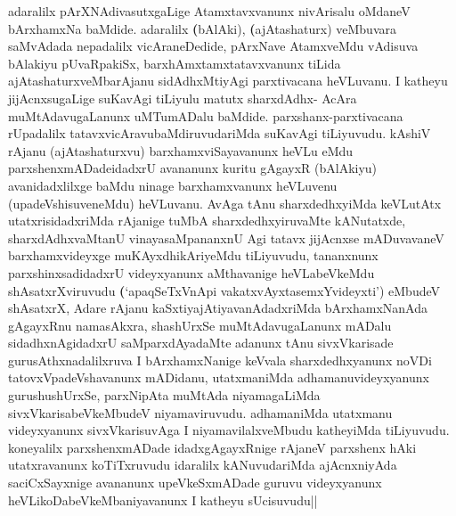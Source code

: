 \begin{artha}
adaralilx pArXNAdivasutxgaLige Atamxtavxvanunx nivArisalu oMdaneV bArxhamxNa 	 baMdide. adaralilx \textbf(bAlAki), \textbf(ajAtashaturx) veMbuvara saMvAdada nepadalilx vicAraneDedide, pArxNave AtamxveMdu vAdisuva bAlakiyu pUvaRpakiSx, barxhAmxtamxtatavxvanunx tiLida ajAtashaturxveMbarAjanu sidAdhxMtiyAgi parxtivacana heVLuvanu. I katheyu jijAcnxsugaLige suKavAgi tiLiyulu matutx sharxdAdhx- AcAra muMtAdavugaLanunx uMTumADalu baMdide. parxshanx-parxtivacana rUpadalilx tatavxvicAravubaMdiruvudariMda suKavAgi tiLiyuvudu. kAshiV rAjanu (ajAtashaturxvu) barxhamxviSayavanunx heVLu eMdu parxshenxmADadeidadxrU avananunx kuritu gAgayxR (bAlAkiyu) avanidadxlilxge baMdu ninage barxhamxvanunx heVLuvenu (upadeVshisuveneMdu) heVLuvanu. AvAga tAnu sharxdedhxyiMda keVLutAtx utatxrisidadxriMda rAjanige tuMbA sharxdedhxyiruvaMte kANutatxde, sharxdAdhxvaMtanU vinayasaMpananxnU Agi tatavx jijAcnxse mADuvavaneV barxhamxvideyxge muKAyxdhikAriyeMdu tiLiyuvudu, tananxnunx parxshinxsadidadxrU videyxyanunx aMthavanige heVLabeVkeMdu shAsatxrXviruvudu \textbf(`apaqSeTxVnApi vakatxvAyxtasemxYvideyxti') eMbudeV shAsatxrX, Adare rAjanu kaSxtiyajAtiyavanAdadxriMda bArxhamxNanAda gAgayxRnu namasAkxra, shashUrxSe muMtAdavugaLanunx mADalu sidadhxnAgidadxrU saMparxdAyadaMte adanunx tAnu sivxVkarisade gurusAthxnadalilxruva I bArxhamxNanige keVvala sharxdedhxyanunx noVDi tatovxVpadeVshavanunx mADidanu, utatxmaniMda adhamanuvideyxyanunx gurushushUrxSe, parxNipAta muMtAda niyamagaLiMda sivxVkarisabeVkeMbudeV niyamaviruvudu. adhamaniMda utatxmanu videyxyanunx sivxVkarisuvAga I niyamavilalxveMbudu katheyiMda tiLiyuvudu. koneyalilx parxshenxmADade idadxgAgayxRnige rAjaneV parxshenx hAki utatxravanunx koTiTxruvudu idaralilx kANuvudariMda ajAcnxniyAda saciCxSayxnige avananunx upeVkeSxmADade guruvu videyxyanunx heVLikoDabeVkeMbaniyavanunx I katheyu sUcisuvudu||
\end{artha}

\centerline{}

